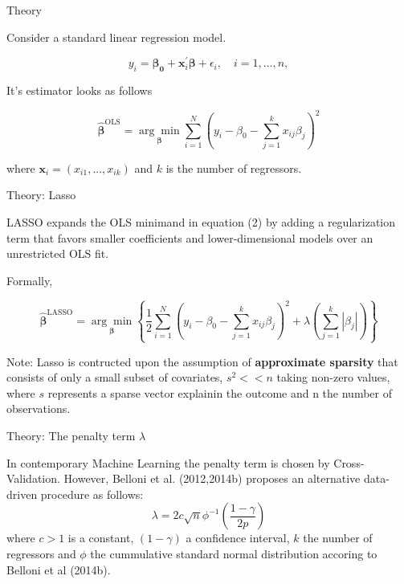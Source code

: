 \documentclass{beamer}
\begin{document}
\begin{frame}{Theory}
\begin{flushleft}
\item Consider a standard linear regression model. 
\end{flushleft}
\[
    y_i=\boldsymbol{\beta_0} +\mathbf{x}_i^\prime \boldsymbol{\beta}+\epsilon_i, \quad i = 1, \ldots, n,
    \tag{1}
\]
\begin{flushleft}
It's estimator looks as follows
\end{flushleft}
\[
\hat{\boldsymbol{\beta}}^{\text{OLS}}=\underset{\boldsymbol{\beta}}{\arg \min}\sum_{i=1}^N (y_i-\beta_0-\sum_{j=1}^k x_{i j}\beta_j)^2
    \tag{2}
\]
\begin{flushleft}
where $\mathbf{x}_i=(x_{i1}, ..., x_{ik})$ and $k$ is the number of regressors.
\end{flushleft}
\end{frame}


\begin{frame}{Theory: Lasso}
\begin{flushleft}
LASSO expands the OLS minimand in equation (2) by adding a regularization term  
that favors smaller coefficients and lower-dimensional models over an unrestricted OLS fit.

Formally, 
\end{flushleft}
	\[
	\hat{\boldsymbol{\beta}}^{\text{LASSO}} =\underset{\boldsymbol{\beta}}{\arg \min}\left\{\frac{1}{2}\sum_{i=1}^N (y_i-\beta_0-\sum_{j=1}^k x_{i j}\beta_j)^2 +\lambda \left(\sum_{j=1}^k |\beta_j|\right)\right\}
	\tag{3}
	\]

\begin{flushleft}
Note: Lasso is contructed upon the assumption of \textbf{approximate sparsity} that consists of only a small subset of covariates, $s^2<<n$ taking non-zero values, where $s$ represents
a sparse vector explainin the outcome and n the number of observations.
\end{flushleft}
\end{frame}


\begin{frame}{Theory: The penalty term $\lambda$}
	\begin{flushleft}
	In contemporary Machine Learning the penalty term is chosen by Cross-Validation. However, 
	Belloni et al. (2012,2014b) proposes an alternative data-driven procedure as follows:
	\[
	\lambda=2c \sqrt{n} \phi^{-1} (\frac{1-\gamma}{2p})
		\tag{4}
	\]
	where $c>1$ is a constant, $(1-\gamma)$ a confidence interval, $k$ the number of regressors and $\phi$ the cummulative standard normal distribution
	accoring to Belloni et al (2014b).
	\end{flushleft}
\end{frame}
\end{document}
